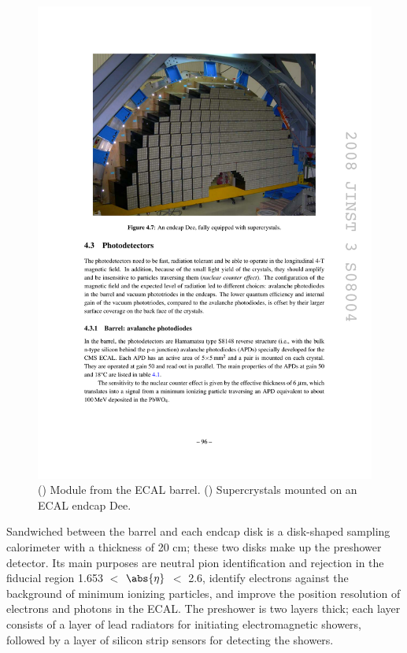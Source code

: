 \begin{figure}[hbtp]
\begin{center}
    \includegraphics[width=\cmsFigWidth]{figures/cms-ecal-supercrystal}
    \caption{(\cmsLeft) Module from the ECAL barrel. (\cmsRight) Supercrystals mounted on an ECAL endcap Dee.~\cite{1748-0221-3-08-S08004}}
    \label{fig:cms-ecal-super}
  \end{center}
\end{figure}

Sandwiched between the barrel and each endcap disk is a disk-shaped sampling calorimeter with a thickness of 20 cm; these two disks make up the preshower detector. Its main purposes are neutral pion identification and rejection in the fiducial region 1.653 $<$ $\abs{\eta}$ $<$ 2.6, identify electrons against the background of minimum ionizing particles, and improve the position resolution of electrons and photons in the ECAL. The preshower is two layers thick; each layer consists of a layer of lead radiators for initiating electromagnetic showers, followed by a layer of silicon strip sensors for detecting the showers.

